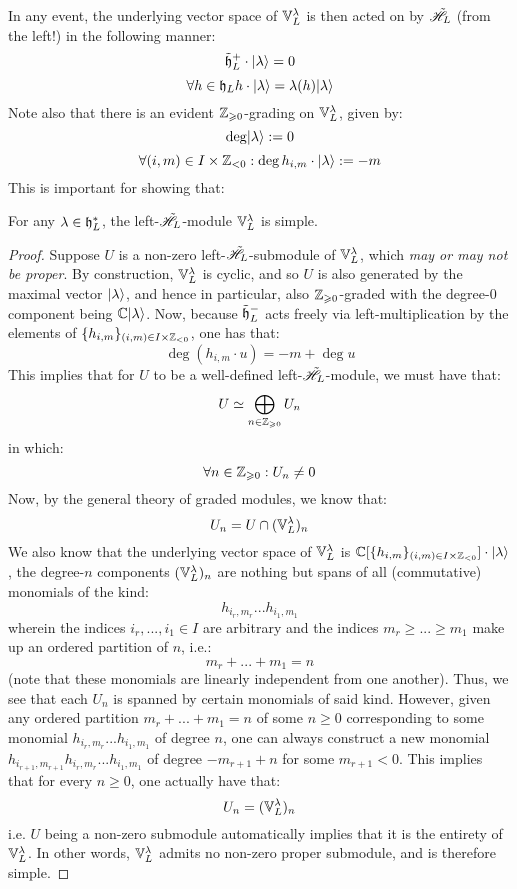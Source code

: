        In any event, the underlying vector space of $\mathbb{V}_L^{\lambda}$ is then acted on by $\tilde{\mathscr{H}}_L$ (from the left!) in the following manner: 
            $$\tilde{\mathfrak{h}}_L^+ \cdot \lvert {\lambda} \rangle = 0$$
            $$\forall h \in \mathfrak{h}_L h \cdot \lvert {\lambda} \rangle = \lambda(h) \lvert {\lambda} \rangle$$
        Note also that there is an evident $\mathbb{Z}_{\geqslant 0}$-grading on $\mathbb{V}_L^{\lambda}$, given by:
            $$\deg \lvert {\lambda} \rangle := 0$$
            $$\forall (i, m) \in I \x \Z_{< 0}: \deg h_{i, m} \cdot \ket{\lambda} := -m$$
        This is important for showing that:
        \begin{lemma} \label{lemma: weyl_vacuum_modules_are_simple}
            For any $\lambda \in \mathfrak{h}_L^*$, the left-$\tilde{\mathscr{H}}_L$-module $\mathbb{V}_L^{\lambda}$ is simple.
        \end{lemma}
            \begin{proof}
                Suppose $U$ is a non-zero left-$\tilde{\mathscr{H}}_L$-submodule of $\mathbb{V}_L^{\lambda}$, which \textit{may or may not be proper}. By construction, $\mathbb{V}_L^{\lambda}$ is cyclic, and so $U$ is also generated by the maximal vector $\lvert {\lambda} \rangle$, and hence in particular, also $\mathbb{Z}_{\geqslant 0}$-graded with the degree-$0$ component being $\mathbb{C} \lvert {\lambda} \rangle$. Now, because $\tilde{\mathfrak{h}}_L^-$ acts freely via left-multiplication by the elements of $\{ h_{i, m} \}_{(i, m) \in I \x \Z_{< 0}}$, one has that:
                    $$\deg( h_{i, m} \cdot u ) = -m + \deg u$$
                This implies that for $U$ to be a well-defined left-$\tilde{\mathscr{H}}_L$-module, we must have that:
                    $$U \simeq \bigoplus_{n \in \mathbb{Z}_{\geqslant 0}} U_n$$
                in which:
                    $$\forall n \in \mathbb{Z}_{\geqslant 0}: U_n \not = 0$$
                Now, by the general theory of graded modules, we know that:
                    $$U_n = U \cap (\mathbb{V}_L^{\lambda})_n$$
                We also know that the underlying vector space of $\mathbb{V}_L^{\lambda}$ is $\bbC[\{ h_{i, m} \}_{(i, m) \in I \x \Z_{< 0}}] \cdot \ket{\lambda}$, the degree-$n$ components $(\mathbb{V}_L^{\lambda})_n$ are nothing but spans of all (commutative) monomials of the kind:
                    $$h_{i_r, m_r} ... h_{i_1, m_1}$$
                wherein the indices $i_r, ..., i_1 \in I$ are arbitrary and the indices $m_r \geq ... \geq m_1$ make up an ordered partition of $n$, i.e.:
                    $$m_r + ... + m_1 = n$$
                (note that these monomials are linearly independent from one another). Thus, we see that each $U_n$ is spanned by certain monomials of said kind. However, given any ordered partition $m_r + ... + m_1 = n$ of some $n \geq 0$ corresponding to some monomial $h_{i_r, m_r} ... h_{i_1, m_1}$ of degree $n$, one can always construct a new monomial $h_{i_{r + 1}, m_{r + 1}} h_{i_r, m_r} ... h_{i_1, m_1}$ of degree $-m_{r + 1} + n$ for some $m_{r + 1} < 0$. This implies that for every $n \geq 0$, one actually have that:
                    $$U_n = (\mathbb{V}_L^{\lambda})_n$$
                i.e. $U$ being a non-zero submodule automatically implies that it is the entirety of $\mathbb{V}_L^{\lambda}$. In other words, $\mathbb{V}_L^{\lambda}$ admits no non-zero proper submodule, and is therefore simple.
            \end{proof}
